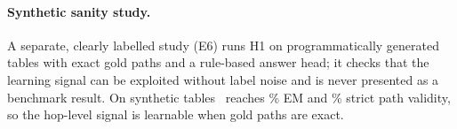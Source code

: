 \paragraph{Synthetic sanity study.}
A separate, clearly labelled study (E6) runs H1 on programmatically generated tables with exact gold paths and a rule-based answer head; it checks that the learning signal can be exploited without label noise and is never presented as a benchmark result.
On synthetic tables \hop\ reaches \SanityEm\% EM and \SanityValid\% strict path validity, so the hop-level signal is learnable when gold paths are exact.
